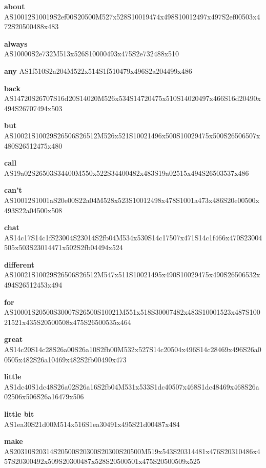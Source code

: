 \documentclass{article}
\begin{document}
\begin{glossary}

\textbf{about}\\
AS10012S10019S2ef00S20500M527x528S10019474x498S10012497x497S2ef00503x472S20500488x483

\textbf{always}\\
AS10000S2e732M513x526S10000493x475S2e732488x510

\textbf{any}
AS1f510S2a204M522x514S1f510479x496S2a204499x486

\textbf{back}\\
AS14720S26707S16d20S14020M526x534S14720475x510S14020497x466S16d20490x494S26707494x503

\textbf{but}\\
AS10021S10029S26506S26512M526x521S10021496x500S10029475x500S26506507x480S26512475x480

\textbf{call}\\
AS19a02S26503S34400M550x522S34400482x483S19a02515x494S26503537x486

\textbf{can't}\\
AS10012S1001aS20e00S22a04M528x523S10012498x478S1001a473x486S20e00500x493S22a04500x508

\textbf{chat}\\
AS14c17S14c1fS23004S23014S2fb04M534x530S14c17507x471S14c1f466x470S23004505x503S23014471x502S2fb04494x524

\textbf{different}\\
AS10021S10029S26506S26512M547x511S10021495x490S10029475x490S26506532x494S26512453x494

\textbf{for}\\
AS10001S20500S30007S26500S10021M551x518S30007482x483S10001523x487S10021521x435S20500508x475S26500535x464

\textbf{great}\\
AS14c20S14c28S26a00S26a10S2fb00M532x527S14c20504x496S14c28469x496S26a00505x482S26a10469x482S2fb00490x473

\textbf{little}\\
AS1dc40S1dc48S26a02S26a16S2fb04M531x533S1dc40507x468S1dc48469x468S26a02506x506S26a16479x506

\textbf{little bit}\\
AS1ea30S21d00M514x516S1ea30491x495S21d00487x484

\textbf{make}\\
AS20310S20314S20500S20300S20300S20500M519x543S20314481x476S20310486x457S20300492x509S20300487x528S20500501x475S20500509x525


\end{glossary}
\end{document}
